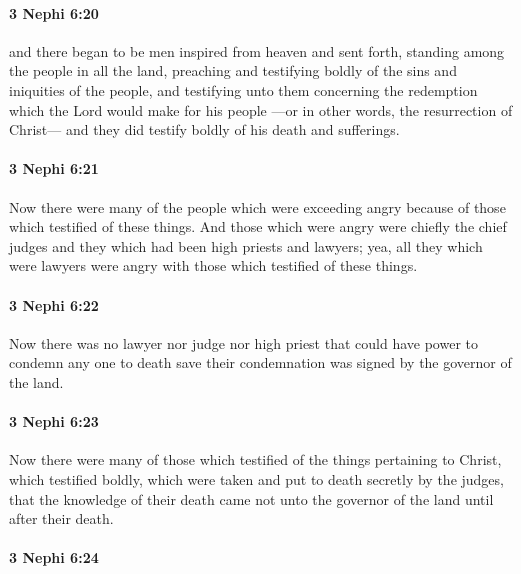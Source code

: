 		\paragraph{3 Nephi 6:20} %
			\label{3NEPHI-6-20}

			and there began to be men inspired from heaven and sent forth,
			standing among the people in all the land,
			preaching and testifying boldly of the sins and iniquities of the people,
			and testifying unto them concerning the redemption
			which the Lord would make for his people
			---or in other words, the resurrection of Christ---
			and they did testify boldly of his death and sufferings.

		\paragraph{3 Nephi 6:21} %
			\label{3NEPHI-6-21}

			Now there were many of the people which were exceeding angry
			because of those which testified of these things.
			And those which were angry were chiefly the chief judges
			and they which had been high priests and lawyers;
			yea, all they which were lawyers were angry
			with those which testified of these things.

		\paragraph{3 Nephi 6:22} %
			\label{3NEPHI-6-22}

			Now there was no lawyer nor judge nor high priest
			that could have power to condemn any one to death
			save their condemnation was signed by the governor of the land.

		\paragraph{3 Nephi 6:23} %
			\label{3NEPHI-6-23}

			Now there were many of those
			which testified of the things pertaining to Christ,
			which testified boldly,
			which were taken and put to death secretly by the judges,
			that the knowledge of their death came not unto the governor of the land
			until after their death.

		\paragraph{3 Nephi 6:24} %
			\label{3NEPHI-6-24}

